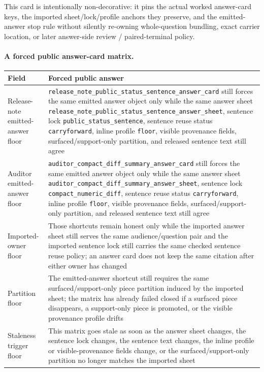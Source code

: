 \documentclass[11pt]{article}
\begin{document}
This card is intentionally non-decorative: it pins the actual worked answer-card keys, the imported sheet/lock/profile anchors they preserve, and the emitted-answer stop rule without silently re-owning whole-question bundling, exact carrier location, or later answer-side review / paired-terminal policy.\cite{series:workedexample}

\paragraph{A forced public answer-card matrix.}
\begin{table}[t]
\centering
\small
\begin{tabularx}{\linewidth}{@{}lX@{}}
\toprule
Field & Forced public answer \\
\midrule
Release-note emitted-answer floor & \nolinkurl{release_note_public_status_sentence_answer_card} still forces the same emitted answer object only while the same answer sheet \nolinkurl{release_note_public_status_sentence_answer_sheet}, sentence lock \nolinkurl{public_status_sentence}, sentence reuse status \nolinkurl{carryforward}, inline profile \nolinkurl{floor}, visible provenance fields, surfaced/support-only partition, and released sentence text still agree \\
Auditor emitted-answer floor & \nolinkurl{auditor_compact_diff_summary_answer_card} still forces the same emitted answer object only while the same answer sheet \nolinkurl{auditor_compact_diff_summary_answer_sheet}, sentence lock \nolinkurl{compact_numeric_diff}, sentence reuse status \nolinkurl{carryforward}, inline profile \nolinkurl{floor}, visible provenance fields, surfaced/support-only partition, and released sentence text still agree \\
Imported-owner floor & Those shortcuts remain honest only while the imported answer sheet still serves the same audience/question pair and the imported sentence lock still carries the same checked sentence reuse policy; an answer card does not keep the same citation after either owner has changed \\
Partition floor & The emitted-answer shortcut still requires the same surfaced/support-only piece partition induced by the imported sheet; the matrix has already failed closed if a surfaced piece disappears, a support-only piece is promoted, or the visible provenance profile drifts \\
Staleness trigger floor & This matrix goes stale as soon as the answer sheet changes, the sentence lock changes, the sentence text changes, the inline profile or visible-provenance fields change, or the surfaced/support-only partition no longer matches the imported sheet \\

\end{tabularx}
\end{table}
\end{document}
